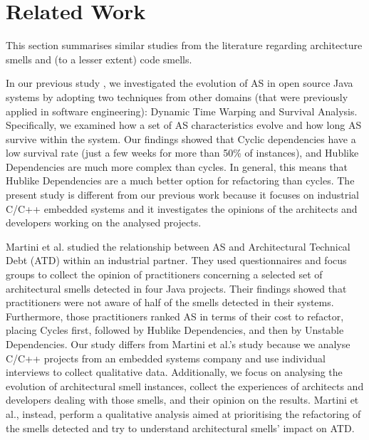 \section{Related Work}\label{c4:sec:related-work}
This section summarises similar studies from the literature regarding architecture smells and (to a lesser extent) code smells.

In our previous study \cite{Sas2019}, we investigated the evolution of AS in open source Java systems by adopting two techniques from other domains (that were previously applied in software engineering): Dynamic Time Warping and Survival Analysis. Specifically, we examined how a set of AS characteristics evolve and how long AS survive within the system.
Our findings showed that Cyclic dependencies have a low survival rate (just a few weeks for more than 50\% of instances), and Hublike Dependencies are much more complex than cycles. In general, this means that Hublike Dependencies are a much better option for refactoring than cycles. 
The present study is different from our previous work because it focuses on industrial C/C++ embedded systems and it investigates the opinions of the architects and developers working on the analysed projects.

Martini et al. \cite{Martini2018} studied the relationship between AS and Architectural Technical Debt (ATD) within an industrial partner. 
They used questionnaires and focus groups to collect the opinion of practitioners concerning a selected set of architectural smells detected in four Java projects.
Their findings showed that practitioners were not aware of half of the smells detected in their systems. Furthermore, those practitioners ranked AS in terms of their cost to refactor, placing Cycles first, followed by Hublike Dependencies, and then by Unstable Dependencies.
Our study differs from Martini et al.'s study because we analyse C/C++ projects from an embedded systems company and use individual interviews to collect qualitative data.
Additionally, we focus on analysing the evolution of architectural smell instances, collect the experiences of architects and developers dealing with those smells, and their opinion on the results.
Martini et al., instead, perform a qualitative analysis aimed at prioritising the refactoring of the smells detected and try to understand architectural smells' impact on ATD.

